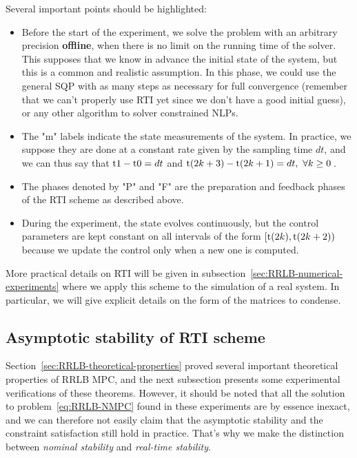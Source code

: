 \documentclass[12pt]{article}
\begin{document}
\noindent Several important points should be highlighted:

\begin{itemize}[label=\textbullet]
	\item Before the start of the experiment, we solve the problem with an arbitrary precision \textbf{offline}, when there is no limit on the running time of the solver.
	This supposes that we know in advance the initial state of the system, but this is a common and realistic assumption.
	In this phase, we could use the general SQP with as many steps as necessary for full convergence (remember that we can't properly use RTI yet since we don't have a good initial guess), or any other algorithm to solver constrained NLPs.

	\item The "\color{green}m\color{black}" labels indicate the state measurements of the system.
	In practice, we suppose they are done at a constant rate given by the sampling time $dt$, and we can thus say that $\rm{t}1-\rm{t}0=dt$ and $\rm{t}(2k+3)-\rm{t}(2k+1)=dt,~\forall k\geq 0$\,.

	\item The phases denoted by "\color{red}P\color{black}" and "\color{blue}F\color{black}" are the preparation and feedback phases of the RTI scheme as described above.

	\item During the experiment, the state evolves continuously, but the control parameters are kept constant on all intervals of the form $[\rm{t}(2k),\rm{t}(2k+2))$ because we update the control only when a new one is computed.
\end{itemize}

More practical details on RTI will be given in subsection~\ref{sec:RRLB-numerical-experiments} where we apply this scheme to the simulation of a real system.
In particular, we will give explicit details on the form of the matrices to condense.

\subsection{Asymptotic stability of RTI scheme}\label{sec:RRLB-real-time-stability}

Section~\ref{sec:RRLB-theoretical-properties} proved several important theoretical properties of RRLB MPC, and the next subsection presents some experimental verifications of these theorems.
However, it should be noted that all the solution to problem~\ref{eq:RRLB-NMPC} found in these experiments are by essence inexact, and we can therefore not easily claim that the asymptotic stability and the constraint satisfaction still hold in practice. That's why we make the distinction between \textit{nominal stability} and \textit{real-time stability}.
\end{document}
